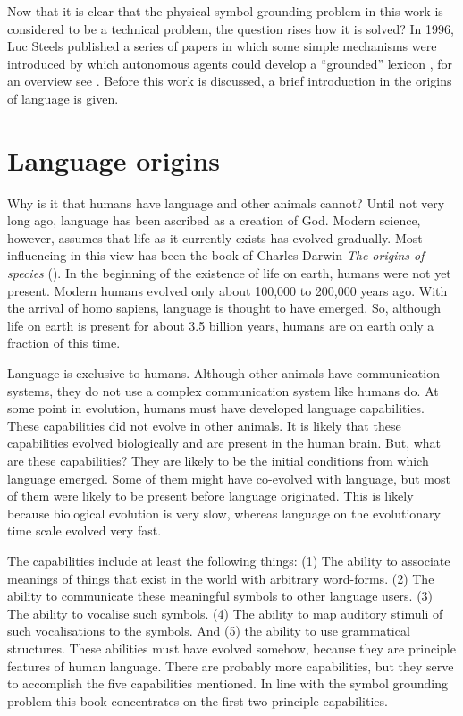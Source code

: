 Now that it is clear that the physical symbol grounding problem in this work is considered to be a technical problem, the question rises how it is solved? In 1996, Luc Steels published a series of papers in which some simple mechanisms were introduced by which autonomous agents could develop a ``grounded'' lexicon \citep{steels:1996a,steels:1996b,steels:1996d,steels:1996e}, for an overview see \citealt{steels:1997b}. Before this work is discussed, a brief introduction in the origins of language is given.

\section{Language origins}\label{s:intro:origins}

Why is it that humans have language and other animals cannot? Until not very long ago, language has been ascribed as a creation of God. Modern science, however, assumes that life as it currently exists has evolved gradually. Most influencing in this view has been the book of Charles Darwin {\em The origins of species} (\citeyear{darwin:1968}). In the beginning of the existence of life on earth, humans were not yet present. Modern humans evolved only about 100,000 to 200,000 years ago. With the arrival of homo sapiens, language is thought to have emerged. So, although life on earth is present for about 3.5 billion years, humans are on earth only a fraction of this time.


Language is exclusive to humans. Although other animals have communication systems, they do not use a complex communication system like humans do. At some point in evolution, humans must have developed language capabilities. These capabilities did not evolve in other animals. It is likely that these capabilities evolved biologically and are present in the human brain. But, what are these capabilities? They are likely to be the initial conditions from which language emerged. Some of them might have co-evolved with language, but most of them were likely to be present before language originated. This is likely because biological evolution is very slow, whereas language on the evolutionary time scale evolved very fast.

The capabilities include at least the following things: (1) The ability to associate meanings of things that exist in the world with arbitrary word-forms. (2) The ability to communicate these meaningful symbols to other language users. (3) The ability to vocalise such symbols. (4) The ability to map auditory stimuli of such vocalisations to the symbols. And (5) the ability to use grammatical structures. These abilities must have evolved somehow, because they are principle features of human language. There are probably more capabilities, but they serve to accomplish the five capabilities mentioned. In line with the symbol grounding problem this book concentrates on the first two principle capabilities.


